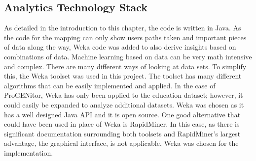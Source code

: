 \subsection{Analytics Technology Stack}
As detailed in the introduction to this chapter, the code is written in Java. 
As the code for the mapping can only show users paths taken and important pieces
of data along the way, Weka code was added to also derive insights based on
combinations of data.  Machine learning based on data can be very math intensive
and complex.  There are many different ways of looking at data sets.  To
simplify this, the Weka toolset was used in this project.  The toolset has many
different algorithms that can be easily implemented and applied.  In the case of
ProGENitor, Weka has only been applied to the education dataset; however, it
could easily be expanded to analyze additional datasets.  Weka was chosen as it
has a well designed Java API and it is open source.  One good alternative
that could have been used in place of Weka is RapidMiner.  In this case, as
there is significant documentation surrounding both toolsets and RapidMiner's
largest advantage, the graphical interface, is not applicable, Weka was chosen
for the implementation.
